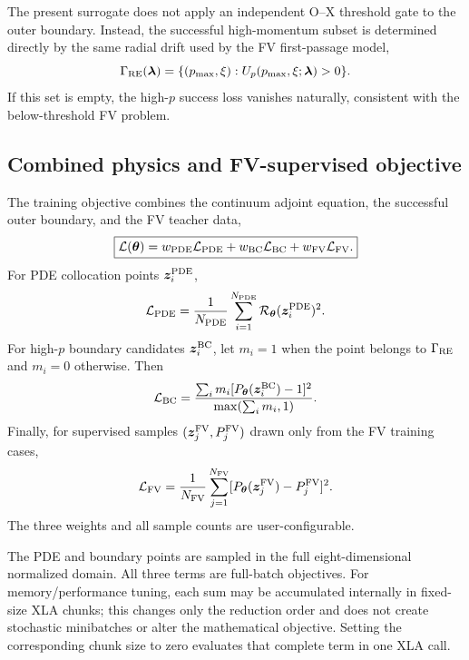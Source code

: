 \documentclass[11pt]{article}
\begin{document}
The present surrogate does not apply an independent O--X threshold gate to the outer
boundary.  Instead, the successful high-momentum subset is determined directly by the
same radial drift used by the FV first-passage model,
\begin{equation}
 \Gamma_{\rm RE}(\bm\lambda)
 =\{(p_{\max},\xi):U_p(p_{\max},\xi;\bm\lambda)>0\}.
 \label{eq:pinn_success_boundary}
\end{equation}
If this set is empty, the high-$p$ success loss vanishes naturally, consistent with the
below-threshold FV problem.

\subsection{Combined physics and FV-supervised objective}
\label{sec:pinn_loss}

The training objective combines the continuum adjoint equation, the successful outer
boundary, and the FV teacher data,
\begin{equation}
 \boxed{
 \mathcal L(\bm\theta)
 =w_{\rm PDE}\mathcal L_{\rm PDE}
 +w_{\rm BC}\mathcal L_{\rm BC}
 +w_{\rm FV}\mathcal L_{\rm FV}.
 }
 \label{eq:pinn_total_loss}
\end{equation}
For PDE collocation points $\bm z_i^{\rm PDE}$,
\begin{equation}
 \mathcal L_{\rm PDE}
 =\frac{1}{N_{\rm PDE}}
  \sum_{i=1}^{N_{\rm PDE}}
  \mathcal R_{\bm\theta}(\bm z_i^{\rm PDE})^2.
 \label{eq:pinn_pde_loss}
\end{equation}
For high-$p$ boundary candidates $\bm z_i^{\rm BC}$, let
$m_i=1$ when the point belongs to $\Gamma_{\rm RE}$ and $m_i=0$ otherwise.  Then
\begin{equation}
 \mathcal L_{\rm BC}
 =\frac{\sum_i m_i
   [P_{\bm\theta}(\bm z_i^{\rm BC})-1]^2}
  {\max(\sum_i m_i,1)}.
 \label{eq:pinn_bc_loss}
\end{equation}
Finally, for supervised samples $(\bm z_j^{\rm FV},P_j^{\rm FV})$ drawn only from the FV
training cases,
\begin{equation}
 \mathcal L_{\rm FV}
 =\frac{1}{N_{\rm FV}}
  \sum_{j=1}^{N_{\rm FV}}
  [P_{\bm\theta}(\bm z_j^{\rm FV})-P_j^{\rm FV}]^2.
 \label{eq:pinn_fv_loss}
\end{equation}
The three weights and all sample counts are user-configurable.

The PDE and boundary points are sampled in the full eight-dimensional normalized domain.
All three terms are full-batch objectives.  For memory/performance tuning, each sum may
be accumulated internally in fixed-size XLA chunks; this changes only the reduction
order and does not create stochastic minibatches or alter the mathematical objective.
Setting the corresponding chunk size to zero evaluates that complete term in one XLA
call.
\end{document}
